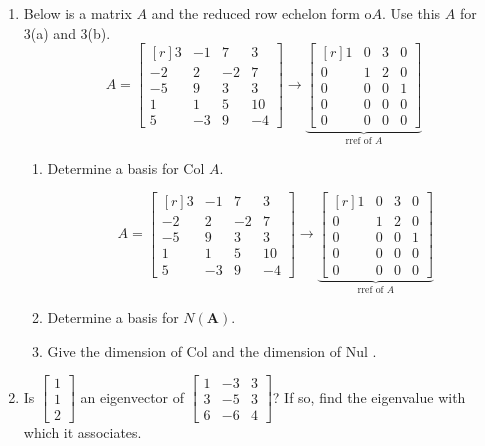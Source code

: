 \documentclass[basic]{inVerba-notes}
\begin{document}
\begin{enumerate}[align=left, leftmargin=0pt, labelindent=\parindent, listparindent=\parindent, labelwidth=0pt, itemindent=!]
  \item Below is a matrix \(A\) and the reduced row echelon form o\(A\). Use this \(A\) for 3(a) and 3(b).
    \[
    A=
    \begin{bmatrix*}[r]
    3 & -1 & 7 & 3 \\
    -2 & 2 & -2 & 7 \\
    -5 & 9 & 3 & 3 \\
    1 & 1 & 5 & 10 \\
    5 & -3 & 9 & -4
    \end{bmatrix*} 
    \rightarrow
    \underbrace{
    \begin{bmatrix*}[r]
    1 & 0 & 3 & 0 \\
    0 & 1 & 2 & 0 \\
    0 & 0 & 0 & 1 \\
    0 & 0 & 0 & 0 \\
    0 & 0 & 0 & 0
    \end{bmatrix*}
    }_{\text{rref of }A}
    \]
  \begin{enumerate}
    \item {} Determine a basis for Col \(A\). 
    
    \newpage
    
    \[
      A=
      \begin{bmatrix*}[r]
        3 & -1 & 7 & 3 \\
        -2 & 2 & -2 & 7 \\
        -5 & 9 & 3 & 3 \\
        1 & 1 & 5 & 10 \\
        5 & -3 & 9 & -4
      \end{bmatrix*} 
      \rightarrow
      \underbrace{
        \begin{bmatrix*}[r]
          1 & 0 & 3 & 0 \\
          0 & 1 & 2 & 0 \\
          0 & 0 & 0 & 1 \\
          0 & 0 & 0 & 0 \\
          0 & 0 & 0 & 0
        \end{bmatrix*}
        }_{\text{rref of }A}
        \]
      \item {} Determine a basis for \(N(\bm{A})\).
      \item {} Give the dimension of Col  and the dimension of Nul .
    \end{enumerate}

    \newpage

  \item {} Is \(\begin{bmatrix}1\\1\\2\end{bmatrix}\) an eigenvector of \(\begin{bmatrix}1 & -3 & 3\\3 & -5 & 3\\6 & -6 & 4\end{bmatrix}\)?  If so, find the eigenvalue with which it associates.
  

\end{enumerate}
\end{document}
